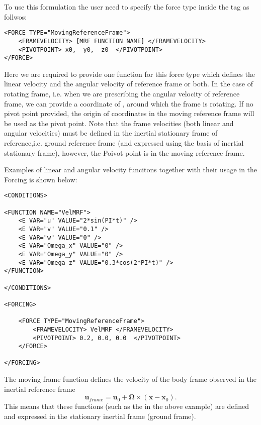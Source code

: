 To use this formulation the user need to specify the force type inside the  tag as follwos:

\begin{lstlisting}[style=XMLStyle]
<FORCE TYPE="MovingReferenceFrame">
    <FRAMEVELOCITY> [MRF FUNCTION NAME] </FRAMEVELOCITY>
    <PIVOTPOINT> x0,  y0,  z0  </PIVOTPOINT>
</FORCE>
\end{lstlisting}

Here we are required to provide one function for this force type which defines the linear velocity and the angular velocity of reference frame or both. In the case of rotating frame, i.e. when we are prescribing the angular velocity of reference frame, we can provide a coordinate of , around which the frame is rotating. If no pivot point provided, the origin of coordinates in the moving reference frame will be used as the pivot point.
Note that the frame velocities (both linear and angular velocities) must be defined in the inertial stationary frame of reference,i.e. ground reference frame (and expressed using the basis of inertial stationary frame), however, the Poivot point is in the moving reference frame.

Examples of linear and angular velocity funcitons together with their usage in the Forcing is shown below:

\begin{lstlisting}[style=XMLStyle]
<CONDITIONS>

<FUNCTION NAME="VelMRF">
    <E VAR="u" VALUE="2*sin(PI*t)" />
    <E VAR="v" VALUE="0.1" />
    <E VAR="w" VALUE="0" />
    <E VAR="Omega_x" VALUE="0" />
    <E VAR="Omega_y" VALUE="0" />
    <E VAR="Omega_z" VALUE="0.3*cos(2*PI*t)" />
</FUNCTION>

</CONDITIONS>

<FORCING>

    <FORCE TYPE="MovingReferenceFrame">
        <FRAMEVELOCITY> VelMRF </FRAMEVELOCITY>
        <PIVOTPOINT> 0.2, 0.0, 0.0  </PIVOTPOINT>
    </FORCE>

</FORCING>
\end{lstlisting}


The moving frame function defines the velocity of the body frame observed in the inertial reference frame $$\mathbf{u}_{frame} = \mathbf{u}_0 + \mathbf{\Omega}\times (\mathbf{x}-\mathbf{x}_0).$$ This means that these functions (such as the  in the above example) are defined and expressed in the stationary inertial frame (ground frame).

